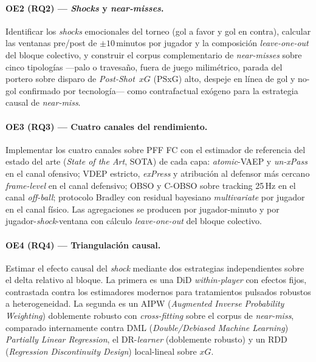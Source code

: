 \paragraph{OE2 (RQ2) --- \textit{Shocks} y \textit{near-misses}.}
Identificar los \textit{shocks} emocionales del torneo (gol a favor y gol
en contra), calcular las ventanas pre/post de $\pm 10$\,minutos por
jugador y la composición \textit{leave-one-out} del bloque colectivo, y
construir el corpus complementario de \textit{near-misses} sobre cinco
tipologías ---palo o travesaño, fuera de juego milimétrico, parada del
portero sobre disparo de \textit{Post-Shot}~$xG$ (PSxG) alto, despeje en
línea de gol y no-gol confirmado por tecnología--- como contrafactual
exógeno para la estrategia causal de \textit{near-miss}.

\paragraph{OE3 (RQ3) --- Cuatro canales del rendimiento.}
Implementar los cuatro canales sobre PFF FC con el estimador de
referencia del estado del arte (\textit{State of the Art}, SOTA) de cada
capa: \textit{atomic}-VAEP y \textit{un-xPass} en el canal ofensivo;
VDEP estricto, \textit{exPress} y atribución al defensor más cercano
\textit{frame-level} en el canal defensivo; OBSO y
C-OBSO sobre tracking 25\,Hz en el canal \emph{off-ball}; protocolo
Bradley con residual bayesiano \textit{multivariate} por jugador en el
canal físico. Las
agregaciones se producen por jugador-minuto y por
jugador-\textit{shock}-ventana con cálculo \textit{leave-one-out} del
bloque colectivo.

\paragraph{OE4 (RQ4) --- Triangulación causal.}
Estimar el efecto causal del \textit{shock} mediante dos estrategias
independientes sobre el delta relativo al bloque. La primera es una
DiD \textit{within-player} con efectos fijos, contrastada contra los
estimadores modernos para tratamientos pulsados robustos a
heterogeneidad. La segunda es un AIPW (\textit{Augmented Inverse
Probability Weighting}) doblemente robusto con \textit{cross-fitting}
sobre el corpus de \textit{near-miss}, comparado internamente contra
DML (\textit{Double/Debiased Machine Learning}) \textit{Partially
Linear Regression}, el DR-\textit{learner} (doblemente robusto) y un
RDD (\textit{Regression Discontinuity Design}) local-lineal sobre $xG$.

